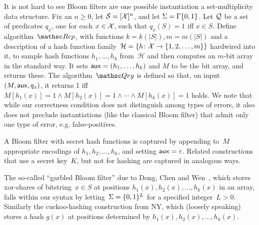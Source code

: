 It is not hard to see Bloom filters are one possible instantiation a set-multiplicity data structure.
Fix an $n \geq 0$, let $\mathcal{S}=[{\cal X}]^n$, and let $\Sigma=\Gamma\{0,1\}$.  
Let ${\cal Q}$ be a set of predicates $q_x$, one for each $x \in {\cal X}$,
such that $q_x(S)=1$ iff $x \in S$.  Define algorithm~$\Rep$, with functions $k=k(|S|), m=m(|S|)$ and a description of a hash function family~$\mathcal{H}=\{h \colon {\cal X} \to \{1,2,\ldots,m\}\}$ hardwired into it, to sample hash functions $h_1, \ldots, h_k$ from~$\mathcal{H}$ and then computes an $m$-bit array in the standard way. It sets ${\sf aux} = (h_1, \ldots, h_k)$ and $M$ to be the bit array, and returns these.  The algorithm~$\Qry$ is defined so that, on input $(M,{\sf aux},q_x)$, it returns 1 iff $M[h_1(x)]=1 \wedge M[h_2(x)]=1 \wedge \cdots \wedge M[h_k(x)]=1$ holds.
We note that while our correctness condition does not distinguish among types of errors, it also does not preclude instantiations (like the classical Bloom filter) that admit only one type of error, e.g. false-positives.  

A Bloom filter with secret hash functions is captured by appending to~$M$ appropriate encodings of $h_1,h_2,\ldots,h_k$, and setting ${\sf aux}=\varepsilon$.  Related constructions that use a secret key~$K$, but not for hashing are captured in analogous ways.

The so-called ``garbled Bloom filter'' due to Dong, Chen and Wen~\cite{xxx}, which stores xor-shares of bitstring~$x \in S$ at positions $h_1(x),h_2(x),\ldots,h_k(x)$ in an array, falls within our syntax by letting~$\Sigma=\{0,1\}^L$ for a specified integer~$L>0$.  Similarly the cuckoo-hashing construction from NY, which (loosely speaking) stores a hash $g(x)$ at positions determined by $h_1(x),h_2(x),\ldots,h_k(x)$.   


